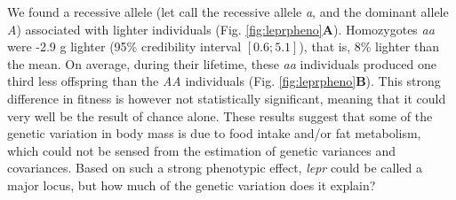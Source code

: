 We found a recessive allele (let call the recessive allele \emph{a}, and the dominant allele \emph{A}) associated with lighter individuals (Fig. \ref{fig:leprpheno}\textbf{A}). Homozygotes \emph{aa} were -2.9 g lighter (95\% credibility interval $[0.6;5.1]$), that is, 8\% lighter than the mean. On average, during their lifetime, these \emph{aa} individuals produced one third less offspring than the \emph{AA} individuals (Fig. \ref{fig:leprpheno}\textbf{B}). This strong difference in fitness is however not statistically significant, meaning that it could very well be the result of chance alone. These results suggest that some of the genetic variation in body mass is due to food intake and/or fat metabolism, which could not be sensed from the estimation of genetic variances and covariances. 
Based on such a strong phenotypic effect, \emph{lepr} could be called a major locus, but how much of the genetic variation does it explain?

